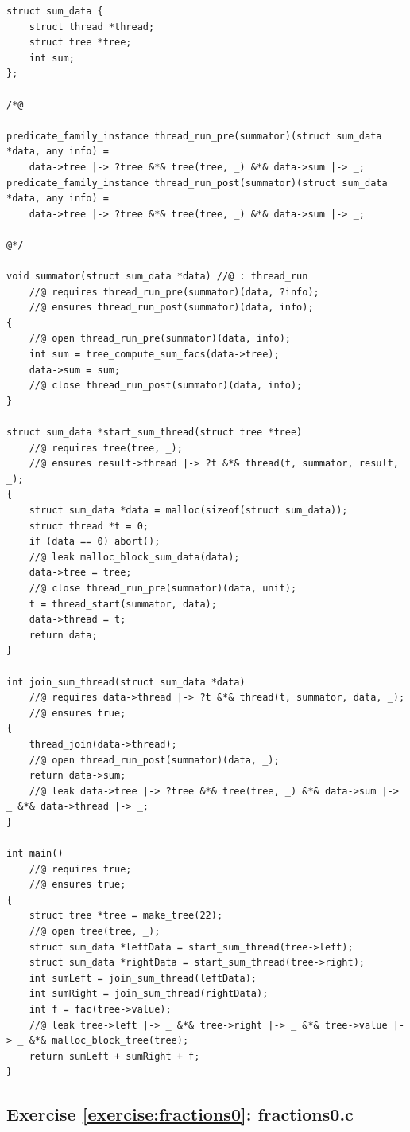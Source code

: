 \documentclass{article}
\begin{document}
\begin{lstlisting}
struct sum_data {
    struct thread *thread;
    struct tree *tree;
    int sum;
};

/*@

predicate_family_instance thread_run_pre(summator)(struct sum_data *data, any info) =
    data->tree |-> ?tree &*& tree(tree, _) &*& data->sum |-> _;
predicate_family_instance thread_run_post(summator)(struct sum_data *data, any info) =
    data->tree |-> ?tree &*& tree(tree, _) &*& data->sum |-> _;

@*/

void summator(struct sum_data *data) //@ : thread_run
    //@ requires thread_run_pre(summator)(data, ?info);
    //@ ensures thread_run_post(summator)(data, info);
{
    //@ open thread_run_pre(summator)(data, info);
    int sum = tree_compute_sum_facs(data->tree);
    data->sum = sum;
    //@ close thread_run_post(summator)(data, info);
}

struct sum_data *start_sum_thread(struct tree *tree)
    //@ requires tree(tree, _);
    //@ ensures result->thread |-> ?t &*& thread(t, summator, result, _);
{
    struct sum_data *data = malloc(sizeof(struct sum_data));
    struct thread *t = 0;
    if (data == 0) abort();
    //@ leak malloc_block_sum_data(data);
    data->tree = tree;
    //@ close thread_run_pre(summator)(data, unit);
    t = thread_start(summator, data);
    data->thread = t;
    return data;
}

int join_sum_thread(struct sum_data *data)
    //@ requires data->thread |-> ?t &*& thread(t, summator, data, _);
    //@ ensures true;
{
    thread_join(data->thread);
    //@ open thread_run_post(summator)(data, _);
    return data->sum;
    //@ leak data->tree |-> ?tree &*& tree(tree, _) &*& data->sum |-> _ &*& data->thread |-> _;
}

int main()
    //@ requires true;
    //@ ensures true;
{
    struct tree *tree = make_tree(22);
    //@ open tree(tree, _);
    struct sum_data *leftData = start_sum_thread(tree->left);
    struct sum_data *rightData = start_sum_thread(tree->right);
    int sumLeft = join_sum_thread(leftData);
    int sumRight = join_sum_thread(rightData);
    int f = fac(tree->value);
    //@ leak tree->left |-> _ &*& tree->right |-> _ &*& tree->value |-> _ &*& malloc_block_tree(tree);
    return sumLeft + sumRight + f;
}
\end{lstlisting}

\subsection{Exercise \ref{exercise:fractions0}: fractions0.c}\label{solution:fractions0}
\end{document}
